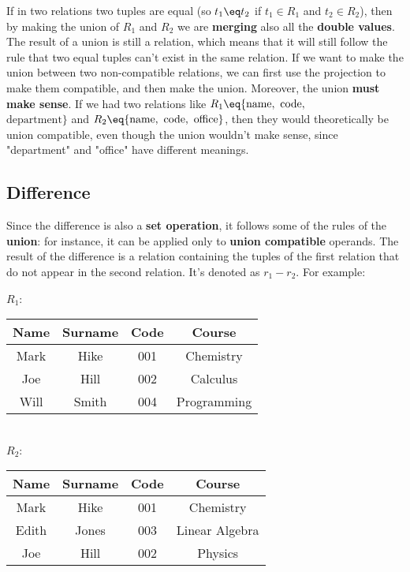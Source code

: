 If in two relations two tuples are equal (so $t_1 \eq t_2$ if $t_1 \in R_1$ and $t_2 \in R_2$), then by making the union of $R_1$ and $R_2$ we are \textbf{merging} also all the \textbf{double values}. The result of a union is still a relation, which means that it will still follow the rule that two equal tuples can't exist in the same relation. If we want to make the union between two non-compatible relations, we can first use the projection to make them compatible, and then make the union.
\nwl
Moreover, the union \textbf{must make sense}. If we had two relations like $R_1 \eq \{\text{name}, \text{ code},$\\$\text{department}\}$ and $R_2 \eq \{\text{name}, \text{ code}, \text{ office}\}$, then they would theoretically be union compatible, even though the union wouldn't make sense, since "department" and "office" have different meanings.

\subsection{Difference}

Since the difference is also a \textbf{set operation}, it follows some of the rules of the \textbf{union}: for instance, it can be applied only to \textbf{union compatible} operands. The result of the difference is a relation containing the tuples of the first relation that do not appear in the second relation. It's denoted as $r_1 - r_2$. For example:

\begin{center}
    $R_1$: \quad \begin{tabular}{|c|c|c|c|}
        \hline \rowcolor{maindoccol!60}
        \textbf{Name} & \textbf{Surname} & \textbf{Code} & \textbf{Course} \\
        \hline
        Mark & Hike & 001 & Chemistry \\
        \hline
        Joe & Hill & 002 & Calculus \\
        \hline
        Will & Smith & 004 & Programming \\
        \hline
    \end{tabular} \\
    \vspace{12pt} $R_2$: \quad \begin{tabular}{|c|c|c|c|}
        \hline \rowcolor{maindoccol!60}
        \textbf{Name} & \textbf{Surname} & \textbf{Code} & \textbf{Course} \\
        \hline
        Mark & Hike & 001 & Chemistry \\
        \hline
        Edith & Jones & 003 & Linear Algebra \\
        \hline
        Joe & Hill & 002 & Physics \\
        \hline
    \end{tabular}
\end{center}

